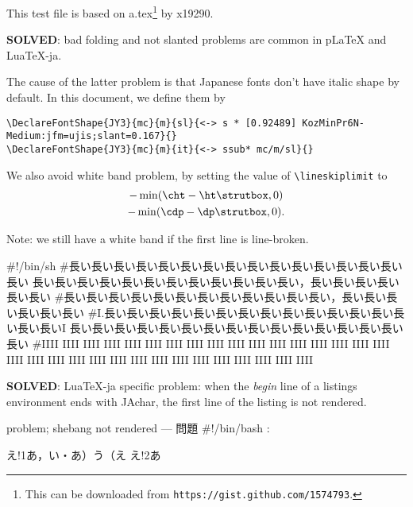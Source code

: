 \documentclass{article}
\def\cs#1{\hbox{\texttt{\textbackslash #1}}}
\begin{document}
This test file is based on a.tex\footnote{This can be downloaded from {\tt https://gist.github.com/1574793}.} by x19290.


\textbf{SOLVED}: bad folding and not slanted problems are common in pLaTeX and LuaTeX-ja.

The cause of the latter problem is that Japanese fonts don't have italic shape by default.
In this document, we define them by
\begin{lstlisting}[language={[AlLaTeX]TeX}, basicstyle=\ttfamily]
\DeclareFontShape{JY3}{mc}{m}{sl}{<-> s * [0.92489] KozMinPr6N-Medium:jfm=ujis;slant=0.167}{}
\DeclareFontShape{JY3}{mc}{m}{it}{<-> ssub* mc/m/sl}{}
\end{lstlisting}
\newpage

We also avoid white band problem, by setting the value of \cs{lineskiplimit} to
\begin{multline}
 {-\min(\cs{cht}-\cs{ht}\cs{strutbox}, 0)}\\
 -\min(\cs{cdp}-\cs{dp}\cs{strutbox}, 0).
\end{multline}

Note: we still have a white band if the first line is line-broken.

\begin{env}{\relax}
#!/bin/sh
#長い長い長い長い長い長い長い長い長い長い長い長い長い長い長い長い
長い長い長い長い長い長い長い長い長い長い長い長い，長い長い長い長い長い長い
#長い長い長い長い長い長い長い長い長い長い長い長い，長い長い長い長い長い長い
#I.長い長い長い長い長い長い長い長い長い長い長い長い長い長い長い長いI
長い長い長い長い長い長い長い長い長い長い長い長い長い長い長い長い
#IIII IIII IIII IIII IIII IIII IIII IIII IIII IIII IIII IIII IIII IIII IIII IIII
IIII IIII IIII IIII IIII IIII IIII IIII IIII IIII IIII IIII IIII IIII IIII IIII
\end{env}

\newpage

\textbf{SOLVED}: LuaTeX-ja specific problem:
when the \emph{begin} line of a listings environment ends with JAchar,
the first line of the listing is not rendered.

\begin{env}{problem; shebang not rendered --- 問題}
#!/bin/bash
:
\end{env}

\begin{LTXexample}[language=TeX]
え!1あ，い・あ）う（え
え!2あ
\end{LTXexample}


\end{document}
